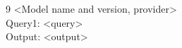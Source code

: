 \documentclass{mcmthesis}
\begin{document}
\AImatter
\begin{ReportAiUse}{9}
   <Model name and version, provider>\\
  Query1: <query>\\
  Output: <output>
\end{ReportAiUse}
\end{document}
